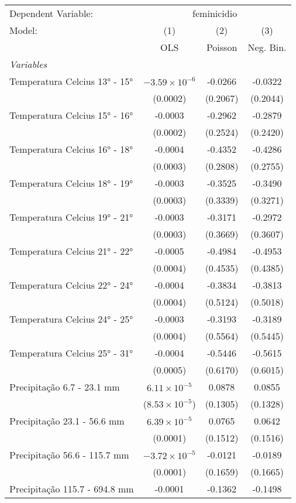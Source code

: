 \documentclass[
]{article}
\begin{document}
\begin{tabular}{lccc}
\tabularnewline\midrule\midrule
Dependent Variable:&\multicolumn{3}{c}{feminicidio}\\
Model:&(1) & (2) & (3)\\
 &  OLS & Poisson & Neg. Bin.\\
\midrule \emph{Variables}&   &   &  \\
Temperatura Celcius 13° - 15° & $-3.59\times 10^{-6}$ & -0.0266 & -0.0322\\
  &(0.0002) & (0.2067) & (0.2044)\\
Temperatura Celcius 15° - 16° & -0.0003 & -0.2962 & -0.2879\\
  &(0.0002) & (0.2524) & (0.2420)\\
Temperatura Celcius 16° - 18° & -0.0004 & -0.4352 & -0.4286\\
  &(0.0003) & (0.2808) & (0.2755)\\
Temperatura Celcius 18° - 19° & -0.0003 & -0.3525 & -0.3490\\
  &(0.0003) & (0.3339) & (0.3271)\\
Temperatura Celcius 19° - 21° & -0.0003 & -0.3171 & -0.2972\\
  &(0.0003) & (0.3669) & (0.3607)\\
Temperatura Celcius 21° - 22° & -0.0005 & -0.4984 & -0.4953\\
  &(0.0004) & (0.4535) & (0.4385)\\
Temperatura Celcius 22° - 24° & -0.0004 & -0.3834 & -0.3813\\
  &(0.0004) & (0.5124) & (0.5018)\\
Temperatura Celcius 24° - 25° & -0.0003 & -0.3193 & -0.3189\\
  &(0.0004) & (0.5564) & (0.5445)\\
Temperatura Celcius 25° - 31° & -0.0004 & -0.5446 & -0.5615\\
  &(0.0005) & (0.6170) & (0.6015)\\
Precipitação 6.7 - 23.1 mm & $6.11\times 10^{-5}$ & 0.0878 & 0.0855\\
  &($8.53\times 10^{-5}$) & (0.1305) & (0.1328)\\
Precipitação 23.1 - 56.6 mm & $6.39\times 10^{-5}$ & 0.0765 & 0.0642\\
  &(0.0001) & (0.1512) & (0.1516)\\
Precipitação 56.6 - 115.7 mm & $-3.72\times 10^{-5}$ & -0.0121 & -0.0189\\
  &(0.0001) & (0.1659) & (0.1665)\\
Precipitação 115.7 - 694.8 mm & -0.0001 & -0.1362 & -0.1498\\

\end{tabular}
\end{document}

